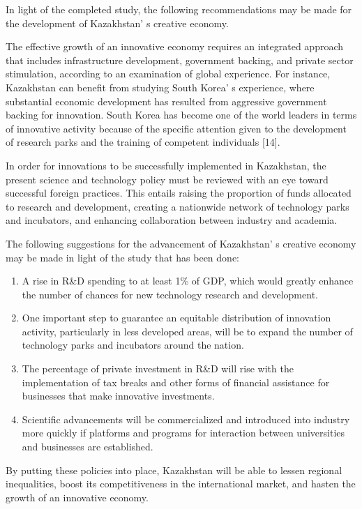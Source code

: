 In light of the completed study, the following recommendations may be
made for the development of Kazakhstan' s creative
economy.

The effective growth of an innovative economy requires an integrated
approach that includes infrastructure development, government backing,
and private sector stimulation, according to an examination of global
experience. For instance, Kazakhstan can benefit from studying South
Korea' s experience, where substantial economic
development has resulted from aggressive government backing for
innovation. South Korea has become one of the world leaders in terms of
innovative activity because of the specific attention given to the
development of research parks and the training of competent individuals
{[}14{]}.

In order for innovations to be successfully implemented in Kazakhstan,
the present science and technology policy must be reviewed with an eye
toward successful foreign practices. This entails raising the proportion
of funds allocated to research and development, creating a nationwide
network of technology parks and incubators, and enhancing collaboration
between industry and academia.

The following suggestions for the advancement of
Kazakhstan' s creative economy may be made in light of
the study that has been done:

\begin{enumerate}
\def\labelenumi{\arabic{enumi}.}
\item
  A rise in R\&D spending to at least 1\% of GDP, which would greatly
  enhance the number of chances for new technology research and
  development.
\item
  One important step to guarantee an equitable distribution of
  innovation activity, particularly in less developed areas, will be to
  expand the number of technology parks and incubators around the
  nation.
\item
  The percentage of private investment in R\&D will rise with the
  implementation of tax breaks and other forms of financial assistance
  for businesses that make innovative investments.
\item
  Scientific advancements will be commercialized and introduced into
  industry more quickly if platforms and programs for interaction
  between universities and businesses are established.
\end{enumerate}

By putting these policies into place, Kazakhstan will be able to lessen
regional inequalities, boost its competitiveness in the international
market, and hasten the growth of an innovative economy.

